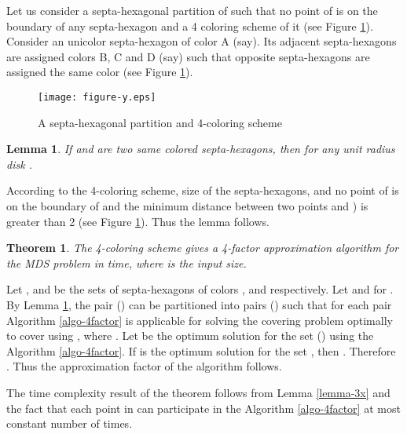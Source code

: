\documentclass[a4paper,11pt]{article}
\newtheorem{theorem}{Theorem}
\newtheorem{lemma}{Lemma}
\newenvironment{proof}{\noindent {\bf Proof:\,\ }}{\hfill\mbox{\
}\smallskip}
\begin{document}
Let us consider a septa-hexagonal partition of  such that no point of  is on the boundary of 
any septa-hexagon and a 4 coloring scheme of it (see Figure \ref{fig:fig10}). Consider an unicolor 
septa-hexagon of color A (say). Its adjacent septa-hexagons are assigned colors B, C and D (say) such 
that opposite septa-hexagons are assigned the same color (see Figure \ref{fig:fig10}).  

\begin{figure}[ht]
\begin{center}
\texttt{[image: figure-y.eps]}
\caption{A septa-hexagonal partition and 4-coloring scheme}
\label{fig:fig10}
\end{center}
\end{figure}

\vspace{-0.1in}
\begin{lemma} \label{lemma-4x}
 If  and  are two same colored septa-hexagons, then 
  for any unit radius disk .
\end{lemma}

\begin{proof}
According to the 4-coloring scheme, size of the septa-hexagons, and no point of  is on the boundary 
of  and  the minimum distance between two points  
and ) is greater than 2 (see Figure \ref{fig:fig10}). Thus the lemma follows.
\end{proof}

\begin{theorem} \label{theorem-1y}
The 4-coloring scheme gives a 4-factor approximation algorithm for the MDS problem in  time, 
where  is the input size.
\end{theorem}

\begin{proof}
Let , and  be the sets of septa-hexagons of colors , and  respectively. 
Let  and  
for . By Lemma 
\ref{lemma-4x}, the pair () can be partitioned into  pairs () 
such that for each pair Algorithm \ref{algo-4factor} is applicable for solving the covering problem optimally 
to cover  using , where . Let  be the optimum solution for the set  
 () using the Algorithm \ref{algo-4factor}. If  is the optimum solution for the 
set , then . Therefore . Thus the 
approximation factor of the algorithm follows.

The time complexity result of the theorem follows from Lemma \ref{lemma-3x} and the fact that each point in 
 can participate in the Algorithm \ref{algo-4factor} at most constant number of times. 
\end{proof}
\end{document}
